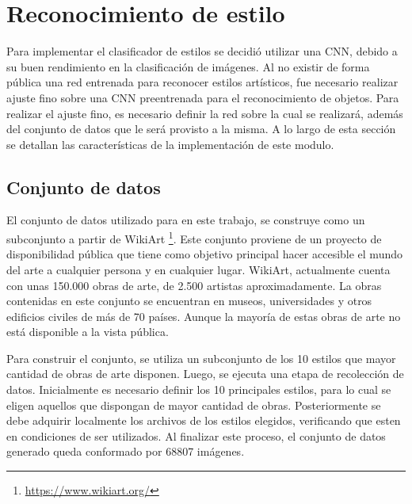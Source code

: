 \documentclass[a4paper,11pt,spanish]{book}
\begin{document}
\section{Reconocimiento de estilo}
  Para implementar el clasificador de estilos se decidió utilizar una CNN, debido a su buen rendimiento en la clasificación de imágenes.
  Al no existir de forma pública una red entrenada para reconocer estilos artísticos, fue necesario realizar ajuste fino sobre una CNN preentrenada para el 
  reconocimiento de objetos.
  Para realizar el ajuste fino, es necesario definir la red sobre la cual se realizará, además del conjunto de datos que le será provisto a la misma.
  A lo largo de esta sección se detallan las características de la implementación de este modulo.
  
  \subsection{Conjunto de datos}
    El conjunto de datos utilizado para en este trabajo, se construye como un subconjunto a partir de WikiArt \footnote{\url{https://www.wikiart.org/}}.
    Este conjunto proviene de un proyecto de disponibilidad pública que tiene como objetivo principal hacer accesible el mundo del arte a cualquier persona y en cualquier lugar.
    WikiArt, actualmente cuenta con unas 150.000 obras de arte, de 2.500 artistas aproximadamente. 
    La obras contenidas en este conjunto se encuentran en museos, universidades y otros edificios civiles de más de 70 países. 
    Aunque la mayoría de estas obras de arte no está disponible a la vista pública.
    
    Para construir el conjunto, se utiliza un subconjunto de los 10 estilos que mayor cantidad de obras de arte disponen. 
    Luego, se ejecuta una etapa de recolección de datos. 
    Inicialmente es necesario definir los 10 principales estilos, para lo cual se eligen aquellos que dispongan de mayor cantidad de obras.
    Posteriormente se debe adquirir localmente los archivos de los estilos elegidos, verificando que esten en condiciones de ser utilizados.
    Al finalizar este proceso, el conjunto de datos generado queda conformado por 68807 imágenes.
    
\end{document}
